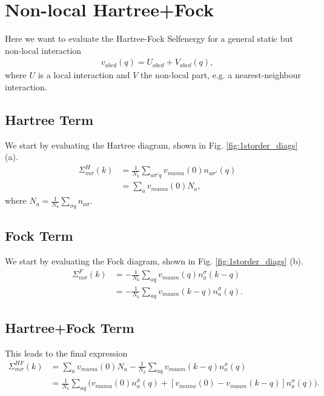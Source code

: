 \documentclass[12pt,a4paper]{scrartcl}
\numberwithin{equation}{section}
\begin{document}

\section{Non-local Hartree+Fock}
\label{sec:nonlocal_hartree_fock}
Here we want to evaluate the Hartree-Fock Selfenergy for a general
static but non-local interaction 
\begin{align}
v_{abcd}(q) = U_{abcd} + V_{abcd}(q),
\end{align}
where $U$ is a local interaction and $V$ the non-local part, e.g. a nearest-neighbour
interaction.


\subsection{Hartree Term}
We start by evaluating the Hartree diagram, shown in Fig. \ref{fig:1storder_diags} (a).
\begin{align}
\Sigma^{H}_{m\sigma}(k)
&= \frac{1}{N_k}\sum_{a\sigma'q} v_{mama}(0) n_{a\sigma'}(q) \\
&= \sum_{a} v_{mama}(0) N_{a},
\end{align}
where $N_{a}=\frac{1}{N_k}\sum_{\sigma q}n_{a\sigma}$.

\subsection{Fock Term}
We start by evaluating the Fock diagram, shown in Fig. \ref{fig:1storder_diags} (b).
\begin{align}
\Sigma^{F}_{m\sigma}(k)
&= -\frac{1}{N_k} \sum_{aq} v_{maam}(q) n^{\sigma}_a(k-q) \\
&= -\frac{1}{N_k} \sum_{aq} v_{maam}(k-q) n^{\sigma}_a(q).
\end{align}

\subsection{Hartree+Fock Term}
This leads to the final expression
\begin{align}
\Sigma^{HF}_{m\sigma}(k)
&= \sum_{a} v_{mama}(0) N_{a}
  -\frac{1}{N_k} \sum_{aq} v_{maam}(k-q) n^{\sigma}_a(q) \\
%
&= \frac{1}{N_k}\sum_{aq}\Big(  v_{mama}(0) n^{\bar{\sigma}}_{a}(q)
                        + \left[ v_{mama}(0) - v_{maam}(k-q) \right] n^{\sigma}_a(q) \Big).
\end{align}
\end{document}
